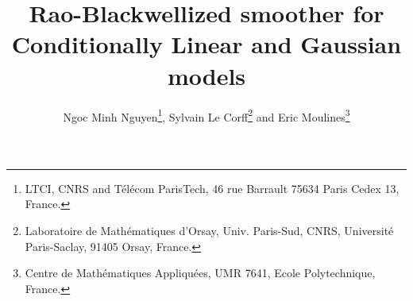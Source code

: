 


\title{Rao-Blackwellized  smoother for Conditionally Linear and Gaussian models}
\date{}

\author{Ngoc Minh Nguyen\footnote{LTCI, CNRS and T\'el\'ecom ParisTech, 46 rue Barrault 75634 Paris Cedex 13, France.}, Sylvain {L}e {C}orff\footnote{Laboratoire de Math\'ematiques d'Orsay, Univ. Paris-Sud, CNRS, Universit\'e Paris-Saclay, 91405 Orsay, France.} and Eric Moulines\footnote{Centre de Math\'ematiques Appliqu\'ees, UMR 7641, Ecole Polytechnique, France.}}


\maketitle

